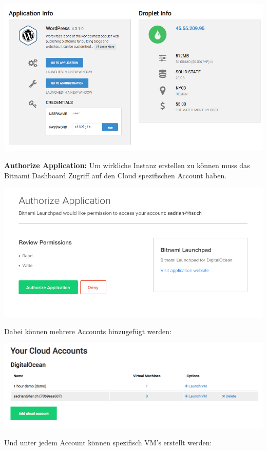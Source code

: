 \includegraphics[width=\textwidth]{./03_Analyse/03_Bitnami/images/digitalocean_infos}

\textbf{Authorize Application:}
Um wirkliche Instanz erstellen zu können muss das Bitnami Dashboard Zugriff auf 
den Cloud spezifischen Account haben.

\includegraphics[width=\textwidth]{./03_Analyse/03_Bitnami/images/digitalocean_authorize}

Dabei können mehrere Accounts hinzugefügt werden:

\includegraphics[width=\textwidth]{./03_Analyse/03_Bitnami/images/digitalocean_accounts}

Und unter jedem Account können spezifisch VM's erstellt werden:

